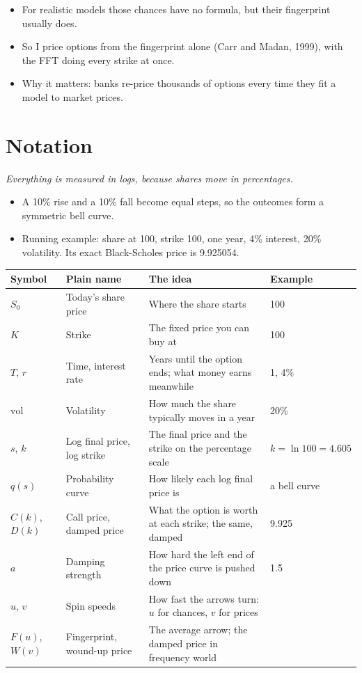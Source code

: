 \documentclass[10pt,a4paper]{article}
\newcommand{\vol}{\mathrm{vol}}
\newcommand{\lead}[1]{{\itshape\fontsize{11}{14}\selectfont\color{accent}#1}\par\vspace{1pt}}
\begin{document}
\begin{itemize}
\item For realistic models those chances have no formula, but their fingerprint usually does.
\item So I price options from the fingerprint alone (Carr and Madan, 1999), with the FFT doing every strike at once.
\item Why it matters: banks re-price thousands of options every time they fit a model to market prices.
\end{itemize}

\section{Notation}

\lead{Everything is measured in logs, because shares move in percentages.}

\begin{itemize}
\item A 10\% rise and a 10\% fall become equal steps, so the outcomes form a symmetric bell curve.
\item Running example: share at 100, strike 100, one year, 4\% interest, 20\% volatility.
Its exact Black-Scholes price is 9.925054.
\end{itemize}

\vspace{2pt}
{\centering\footnotesize\renewcommand{\arraystretch}{0.98}
\begin{tabular}{@{}llll@{}}
\toprule
\color{muted}Symbol & \color{muted}Plain name & \color{muted}The idea & \color{muted}Example \\
\midrule
$S_0$ & Today's share price & Where the share starts & 100 \\
$K$ & Strike & The fixed price you can buy at & 100 \\
$T$, $r$ & Time, interest rate & Years until the option ends; what money earns meanwhile & 1, 4\% \\
$\vol$ & Volatility & How much the share typically moves in a year & 20\% \\
$s$, $k$ & Log final price, log strike & The final price and the strike on the percentage scale & $k = \ln 100 = 4.605$ \\
$q(s)$ & Probability curve & How likely each log final price is & a bell curve \\
$C(k)$, $D(k)$ & Call price, damped price & What the option is worth at each strike; the same, damped & 9.925 \\
$a$ & Damping strength & How hard the left end of the price curve is pushed down & 1.5 \\
$u$, $v$ & Spin speeds & How fast the arrows turn: $u$ for chances, $v$ for prices & \\
$F(u)$, $W(v)$ & Fingerprint, wound-up price & The average arrow; the damped price in frequency world & \\
\bottomrule
\end{tabular}\par}
\vspace{2pt}
\end{document}
